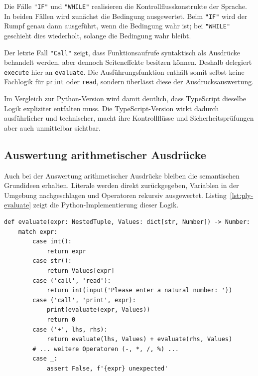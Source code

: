 Die Fälle \texttt{"IF"} und \texttt{"WHILE"} realisieren die Kontrollflusskonstrukte der Sprache. In beiden Fällen wird zunächst die Bedingung ausgewertet. Beim \texttt{"IF"} wird der Rumpf genau dann ausgeführt, wenn die Bedingung wahr ist; bei \texttt{"WHILE"} geschieht dies wiederholt, solange die Bedingung wahr bleibt.

Der letzte Fall \texttt{"Call"} zeigt, dass Funktionsaufrufe syntaktisch als Ausdrücke behandelt werden, aber dennoch Seiteneffekte besitzen können. Deshalb delegiert \texttt{execute} hier an \texttt{evaluate}. Die Ausführungsfunktion enthält somit selbst keine Fachlogik für \texttt{print} oder \texttt{read}, sondern überlässt diese der Ausdrucksauswertung.

Im Vergleich zur Python-Version wird damit deutlich, dass TypeScript dieselbe Logik expliziter entfalten muss. Die TypeScript-Version wirkt dadurch ausführlicher und technischer, macht ihre Kontrollflüsse und Sicherheitsprüfungen aber auch unmittelbar sichtbar.

\subsection{Auswertung arithmetischer Ausdrücke}

Auch bei der Auswertung arithmetischer Ausdrücke bleiben die semantischen Grundideen erhalten. Literale werden direkt zurückgegeben, Variablen in der Umgebung nachgeschlagen und Operatoren rekursiv ausgewertet. Listing~\ref{lst:ply-evaluate} zeigt die Python-Implementierung dieser Logik.

\begin{listing}[htbp]
\caption{Arithmetische Auswertung in Python}
\label{lst:ply-evaluate}
\begin{verbatim}
def evaluate(expr: NestedTuple, Values: dict[str, Number]) -> Number:
    match expr:
        case int():
            return expr
        case str():
            return Values[expr] 
        case ('call', 'read'):
            return int(input('Please enter a natural number: '))
        case ('call', 'print', expr):
            print(evaluate(expr, Values))
            return 0
        case ('+', lhs, rhs):
            return evaluate(lhs, Values) + evaluate(rhs, Values)
        # ... weitere Operatoren (-, *, /, %) ...
        case _:
            assert False, f'{expr} unexpected'
\end{verbatim}
\end{listing}

